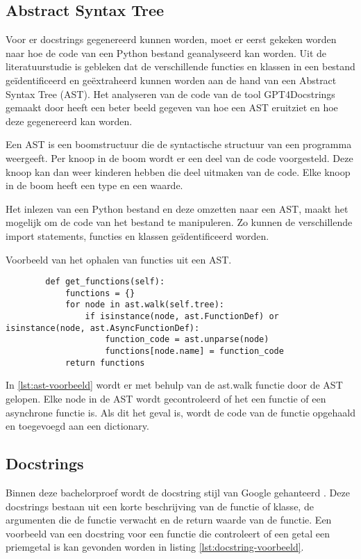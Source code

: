 \subsection{Abstract Syntax Tree}
\label{sec:bestanddocumentatie-ast}
Voor er docstrings gegenereerd kunnen worden, moet er eerst gekeken worden naar hoe de code van een Python bestand geanalyseerd kan worden.
Uit de literatuurstudie is gebleken dat de verschillende functies en klassen in een bestand geïdentificeerd en geëxtraheerd kunnen worden aan de hand van een Abstract Syntax Tree (AST).
Het analyseren van de code van de tool GPT4Docstrings gemaakt door \textcite{Trofficus2023} heeft een beter beeld gegeven van hoe een AST eruitziet en hoe deze gegenereerd kan worden.

Een AST is een boomstructuur die de syntactische structuur van een programma weergeeft.
Per knoop in de boom wordt er een deel van de code voorgesteld. 
Deze knoop kan dan weer kinderen hebben die deel uitmaken van de code.
Elke knoop in de boom heeft een type en een waarde.

Het inlezen van een Python bestand en deze omzetten naar een AST, maakt het mogelijk om de code van het bestand te manipuleren.
Zo kunnen de verschillende import statements, functies en klassen geïdentificeerd worden.

\begin{listing}
    \caption[Ophalen functies uit AST]{Voorbeeld van het ophalen van functies uit een AST.}
    \label{lst:ast-voorbeeld}
    \begin{verbatim}
        def get_functions(self):
            functions = {}
            for node in ast.walk(self.tree):
                if isinstance(node, ast.FunctionDef) or isinstance(node, ast.AsyncFunctionDef):
                    function_code = ast.unparse(node)
                    functions[node.name] = function_code
            return functions
    \end{verbatim}
\end{listing}

In \ref{lst:ast-voorbeeld} wordt er met behulp van de ast.walk functie door de AST gelopen.
Elke node in de AST wordt gecontroleerd of het een functie of een asynchrone functie is.
Als dit het geval is, wordt de code van de functie opgehaald en toegevoegd aan een dictionary.

\subsection{Docstrings}
\label{sec:bestanddocumentatie-docstrings}
Binnen deze bachelorproef wordt de docstring stijl van Google gehanteerd \autocite{GPT2024}.
Deze docstrings bestaan uit een korte beschrijving van de functie of klasse, de argumenten die de functie verwacht en de return waarde van de functie.
Een voorbeeld van een docstring voor een functie die controleert of een getal een priemgetal is kan gevonden worden in listing \ref{lst:docstring-voorbeeld}.

